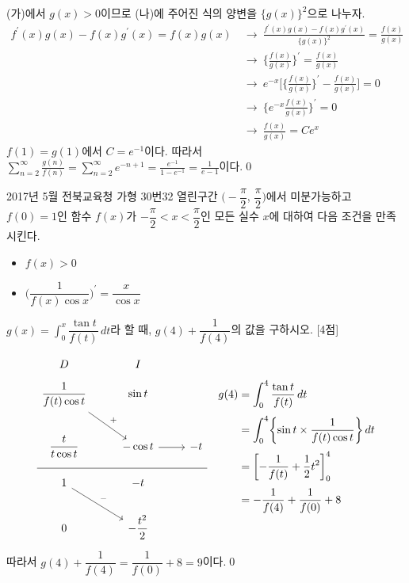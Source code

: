 \documentclass{article}
\begin{document}
\begin{sol}
	(가)에서 $g(x)>0$이므로 (나)에 주어진 식의 양변을 $\{g(x)\}^2$으로 나누자.
	\begin{align*}
		f^{\prime}(x)g(x)-f(x)g^{\prime}(x)=f(x)g(x)~&\longrightarrow~\frac{f^{\prime}(x)g(x)-f(x)g^{\prime}(x)}{\{g(x)\}^2}=\frac{f(x)}{g(x)}\\[3pt]
		&\longrightarrow~\biggl\{\frac{f(x)}{g(x)}\biggr\}^{\prime}=\frac{f(x)}{g(x)}\\[3pt]
		&\longrightarrow~e^{-x}\biggl[\biggl\{\frac{f(x)}{g(x)}\biggr\}^{\prime}-\frac{f(x)}{g(x)}\biggr]=0\\[3pt]
		&\longrightarrow~\biggl\{e^{-x}\frac{f(x)}{g(x)}\biggr\}^{\prime}=0\\[3pt]
		&\longrightarrow~\frac{f(x)}{g(x)}=Ce^{x}
	\end{align*}
	$f(1)=g(1)$에서 $C=e^{-1}$이다. 따라서 $\displaystyle\sum_{n=2}^\infty\frac{g(n)}{f(n)}=\displaystyle\sum_{n=2}^\infty e^{-n+1}=\frac{e^{-1}}{1-e^{-1}}=\frac{1}{e-1}$이다.\qed
\end{sol}

\newpage
\begin{prob}{2017년 5월 전북교육청 가형 30번}{32}
	열린구간 $\biggl(-\dfrac{\pi}{2}$, $\dfrac{\pi}{2}\biggr)$에서 미분가능하고 $f(0)=1$인 함수 $f(x)$가 $-\dfrac{\pi}{2}<x<\dfrac{\pi}{2}$인 모든 실수 $x$에 대하여 다음 조건을 만족시킨다.
	\begin{hint}
		\begin{itemize}
			\item[(가)] $f(x)>0$
			\item[(나)] $\biggl(\dfrac{1}{f(x)\cos x}\biggr)^{\prime}=\dfrac{x}{\cos x}$
		\end{itemize}
	\end{hint}
	$g(x)=\displaystyle\int_0^x\dfrac{\tan t}{f(t)}\,dt$라 할 때, $g(4)+\dfrac{1}{f(4)}$의 값을 구하시오. [4점]
\end{prob}

\begin{sol}
	\[
		\begin{tikzcd}
			D & I & \\[-12pt]
			\dfrac{1}{f(t)\cos t} \arrow[rd, "+"] & \sin t & \\
			\dfrac{t}{t\cos t} & -\cos t \arrow[r] & -t \\[-12pt] \hline \\[-12pt]
			1 \arrow[rd, "-"] & -t & \\
			0 & -\dfrac{t^2}{2} &
		\end{tikzcd}\quad\begin{aligned}
			g(4)&=\int_0^4\frac{\tan t}{f(t)}\,dt\\[3pt]
			&=\int_0^4\biggl\{\sin t\times \frac{1}{f(t)\cos t}\biggr\}\,dt\\[3pt]
			&=\biggl[-\frac{1}{f(t)}+\frac{1}{2}t^2\biggr]_0^4\\[3pt]
			&=-\frac{1}{f(4)}+\frac{1}{f(0)}+8
		\end{aligned}
	\]
	따라서 $g(4)+\dfrac{1}{f(4)}=\dfrac{1}{f(0)}+8=9$이다.\qed
\end{sol}
\end{document}
